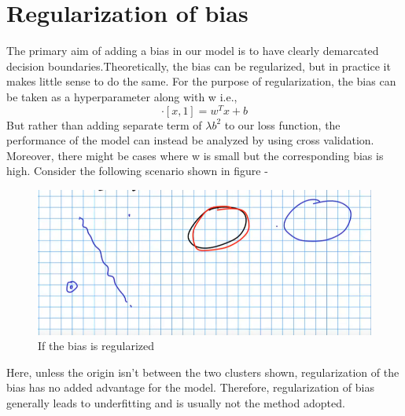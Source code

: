 \section{Regularization of bias}
The primary aim of adding a bias in our model is to have clearly demarcated decision boundaries.Theoretically, the bias can be regularized, but in practice it makes little sense to do the same. For the purpose of regularization, the bias can be taken as a hyperparameter along with w i.e.,
\begin{equation*}
    [w,b]\cdot[x,1] = w^Tx+b
\end{equation*}
But rather than adding separate term of $\lambda b^2$ to our loss function, the performance of the model can instead be analyzed by using cross validation.\\
Moreover, there might be cases where w is small but the corresponding bias is high.
Consider the following scenario shown in figure - 
\newline
\begin{figure}[h]
    \centering
    \includegraphics[scale = 0.5]{pictures/ifbregularise.png}
    \caption{If the bias is regularized}
\end{figure}


Here, unless the origin isn't between the two clusters shown, regularization of the bias has no added advantage for the model. Therefore, regularization of bias generally leads to underfitting and is usually not the method adopted.

